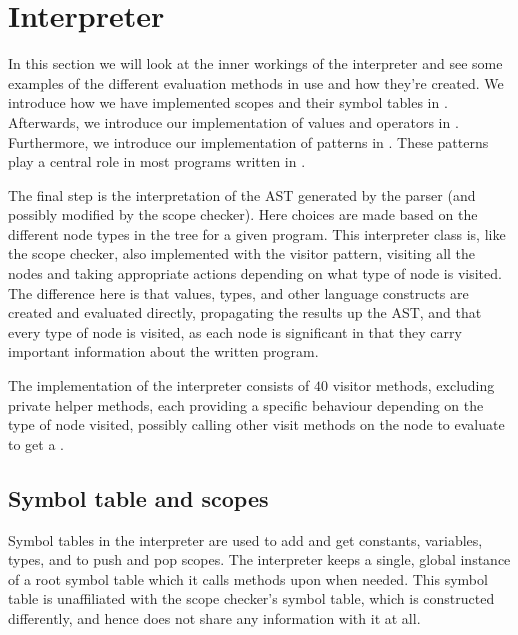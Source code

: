 \section{Interpreter}
\label{sec:interpreter}

In this section we will look at the inner workings of the interpreter
and see some examples of the different evaluation methods in use and how
they're created. We introduce how we have implemented scopes and their symbol
tables in . Afterwards, we introduce our
implementation of values and operators in .
Furthermore, we introduce our implementation of patterns in 
. These patterns play a central role in most programs 
written in \productname{}.

The final step is the interpretation of the AST generated by the parser
(and possibly modified by the scope checker). Here
choices are made based on the different node types in the tree for a
given program. This interpreter class is, like the scope checker, also
implemented with the visitor pattern, visiting all the nodes and taking
appropriate actions depending on what type of node is visited. The
difference here is that values, types, and other language constructs are
created and evaluated directly, propagating the results up the AST, and
that every type of node is visited, as each node is significant in that
they carry important information about the written program.

The implementation of the interpreter consists of $40$ visitor methods,
excluding private helper methods, each providing a specific behaviour
depending on the type of node visited, possibly calling other visit
methods on the node to evaluate to get a .


\subsection{Symbol table and scopes}
\label{sec:symboltableandscopes}
Symbol tables in the interpreter are used to add and get constants,
variables, types, and to push and pop scopes. The interpreter keeps a
single, global instance of a root symbol table which it calls methods
upon when needed. This symbol table is unaffiliated with the scope
checker's symbol table, which is constructed differently, and hence does
not share any information with it at all.

